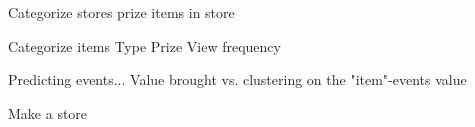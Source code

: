 Categorize stores
    prize
    items in store

Categorize items
    Type
    Prize
    View frequency

Predicting events...
    Value brought vs. clustering on the "item"-events value

Make a store












